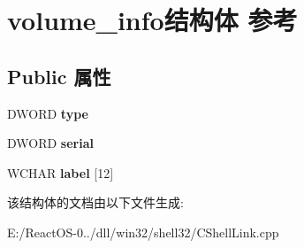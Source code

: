 \hypertarget{structvolume__info}{}\section{volume\+\_\+info结构体 参考}
\label{structvolume__info}
\subsection*{Public 属性}
\begin{DoxyCompactItemize}
\item 
\mbox{\label{structvolume__info_a6b40307fa34ae5f791be3ea066bc2708}} 
D\+W\+O\+RD {\bfseries type}
\item 
\mbox{\label{structvolume__info_a1f18e31f699580b569e4b179c492d3df}} 
D\+W\+O\+RD {\bfseries serial}
\item 
\mbox{\label{structvolume__info_ad570c0ff37fcfba60ea4e7d98ad5c042}} 
W\+C\+H\+AR {\bfseries label} \mbox{[}12\mbox{]}
\end{DoxyCompactItemize}


该结构体的文档由以下文件生成\+:\begin{DoxyCompactItemize}
\item 
E\+:/\+React\+O\+S-\/0../dll/win32/shell32/C\+Shell\+Link.\+cpp\end{DoxyCompactItemize}
